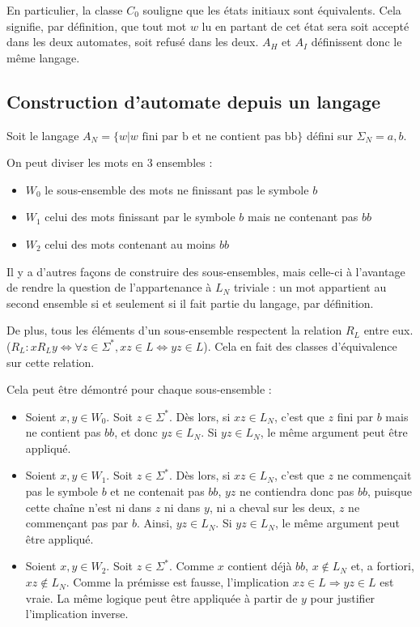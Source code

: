 	 En particulier, la classe $C_0$ souligne que les états initiaux sont équivalents. Cela signifie, par définition, que tout mot $w$ lu en partant de cet état sera soit accepté dans les deux automates, soit refusé dans les deux. $A_H$ et $A_I$ définissent donc le même langage.
	 
	 
	 
	 \subsection{Construction d'automate depuis un langage}
	 
	 Soit le langage $A_N = \{w | w \text{ fini par b et ne contient pas bb}\}$ défini sur $\Sigma_N = {a,b}$.
	 
	 On peut diviser les mots en 3 ensembles : 
	 
	 \begin{itemize}
	 	\item $W_0$ le sous-ensemble des mots ne finissant pas le symbole $b$
	 	\item $W_1$ celui des mots finissant par le symbole $b$ mais ne contenant pas $bb$
	 	\item $W_2$ celui des mots contenant au moins $bb$
	 \end{itemize}
	 
	 Il y a d'autres façons de construire des sous-ensembles, mais celle-ci à l'avantage de rendre la question de l'appartenance à $L_N$ triviale : un mot appartient au second ensemble si et seulement si il fait partie du langage, par définition.
	 
	 De plus, tous les éléments d'un sous-ensemble respectent la relation $R_L$ entre eux. ($R_L : xR_Ly \Leftrightarrow \forall z \in \Sigma^*, xz \in L \Leftrightarrow yz \in L$). Cela en fait des classes d'équivalence sur cette relation.
	 
	 Cela peut être démontré pour chaque sous-ensemble :
	 \begin{itemize}
	 	\item Soient $x,y \in W_0$. Soit $z \in \Sigma^*$. Dès lors, si $xz \in L_N$, c'est que $z$ fini par $b$ mais ne contient pas $bb$, et donc $yz \in L_N$. Si $yz \in L_N$, le même argument peut être appliqué.
	 	\item Soient $x,y \in W_1$. Soit $z \in \Sigma^*$. Dès lors, si $xz \in L_N$, c'est que $z$ ne commençait pas le symbole $b$ et ne contenait pas $bb$, $yz$ ne contiendra donc pas $bb$, puisque cette chaîne n'est ni dans $z$ ni dans $y$, ni a cheval sur les deux, $z$ ne commençant pas par $b$. Ainsi, $yz \in L_N$. Si $yz \in L_N$, le même argument peut être appliqué.
	 	\item Soient $x,y \in W_2$. Soit $z \in \Sigma^*$. Comme $x$ contient déjà $bb$, $x \notin L_N$ et, a fortiori, $xz \notin L_N$. Comme la prémisse est fausse, l'implication $xz \in L \Rightarrow yz \in L$ est vraie. La même logique peut être appliquée à partir de $y$ pour justifier l'implication inverse.
	 \end{itemize}
	 

